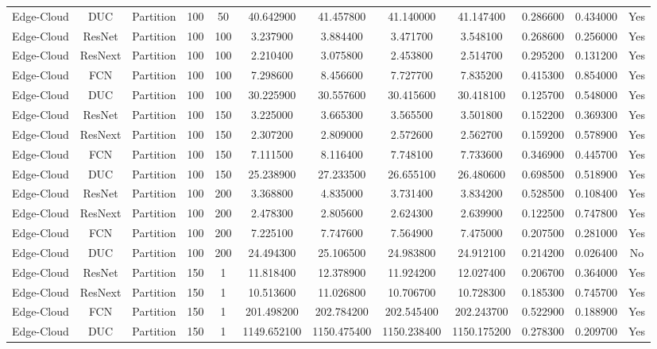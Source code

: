 \begin{tabular}{|c||c||c||c||c||c||c||c||c||c||c||c|}
Edge-Cloud & DUC & Partition & 100 & 50 & 40.642900 & 41.457800 & 41.140000 & 41.147400 & 0.286600 & 0.434000 & Yes \\
Edge-Cloud & ResNet & Partition & 100 & 100 & 3.237900 & 3.884400 & 3.471700 & 3.548100 & 0.268600 & 0.256000 & Yes \\
Edge-Cloud & ResNext & Partition & 100 & 100 & 2.210400 & 3.075800 & 2.453800 & 2.514700 & 0.295200 & 0.131200 & Yes \\
Edge-Cloud & FCN & Partition & 100 & 100 & 7.298600 & 8.456600 & 7.727700 & 7.835200 & 0.415300 & 0.854000 & Yes \\
Edge-Cloud & DUC & Partition & 100 & 100 & 30.225900 & 30.557600 & 30.415600 & 30.418100 & 0.125700 & 0.548000 & Yes \\
Edge-Cloud & ResNet & Partition & 100 & 150 & 3.225000 & 3.665300 & 3.565500 & 3.501800 & 0.152200 & 0.369300 & Yes \\
Edge-Cloud & ResNext & Partition & 100 & 150 & 2.307200 & 2.809000 & 2.572600 & 2.562700 & 0.159200 & 0.578900 & Yes \\
Edge-Cloud & FCN & Partition & 100 & 150 & 7.111500 & 8.116400 & 7.748100 & 7.733600 & 0.346900 & 0.445700 & Yes \\
Edge-Cloud & DUC & Partition & 100 & 150 & 25.238900 & 27.233500 & 26.655100 & 26.480600 & 0.698500 & 0.518900 & Yes \\
Edge-Cloud & ResNet & Partition & 100 & 200 & 3.368800 & 4.835000 & 3.731400 & 3.834200 & 0.528500 & 0.108400 & Yes \\
Edge-Cloud & ResNext & Partition & 100 & 200 & 2.478300 & 2.805600 & 2.624300 & 2.639900 & 0.122500 & 0.747800 & Yes \\
Edge-Cloud & FCN & Partition & 100 & 200 & 7.225100 & 7.747600 & 7.564900 & 7.475000 & 0.207500 & 0.281000 & Yes \\
Edge-Cloud & DUC & Partition & 100 & 200 & 24.494300 & 25.106500 & 24.983800 & 24.912100 & 0.214200 & 0.026400 & No \\
Edge-Cloud & ResNet & Partition & 150 & 1 & 11.818400 & 12.378900 & 11.924200 & 12.027400 & 0.206700 & 0.364000 & Yes \\
Edge-Cloud & ResNext & Partition & 150 & 1 & 10.513600 & 11.026800 & 10.706700 & 10.728300 & 0.185300 & 0.745700 & Yes \\
Edge-Cloud & FCN & Partition & 150 & 1 & 201.498200 & 202.784200 & 202.545400 & 202.243700 & 0.522900 & 0.188900 & Yes \\
Edge-Cloud & DUC & Partition & 150 & 1 & 1149.652100 & 1150.475400 & 1150.238400 & 1150.175200 & 0.278300 & 0.209700 & Yes \\

\end{tabular}
